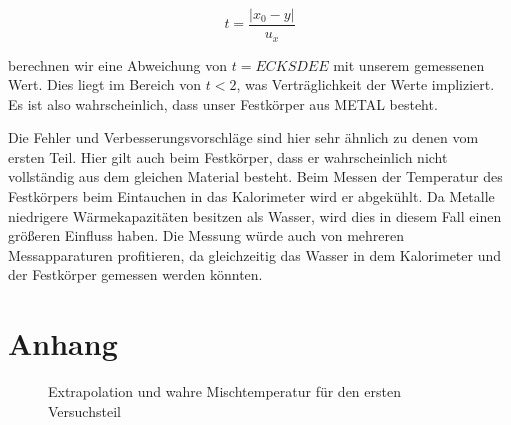 \documentclass[11pt,a4paper]{article}
\begin{document}
\begin{equation}
t=\frac{|x_0-y|}{u_x}\label{abw}
\end{equation}

berechnen wir eine Abweichung von $t=ECKSDEE$ mit unserem gemessenen Wert. Dies liegt im Bereich von $t<2$, was Vertr\"aglichkeit der Werte impliziert. Es ist also wahrscheinlich, dass unser Festk\"orper aus METAL besteht.

Die Fehler und Verbesserungsvorschl\"age sind hier sehr \"ahnlich zu denen vom ersten Teil. Hier gilt auch beim Festk\"orper, dass er wahrscheinlich nicht vollst\"andig aus dem gleichen Material besteht. Beim Messen der Temperatur des Festk\"orpers beim Eintauchen in das Kalorimeter wird er abgek\"uhlt. Da Metalle niedrigere W\"armekapazit\"aten besitzen als Wasser, wird dies in diesem Fall einen gr\"o\ss eren Einfluss haben. Die Messung w\"urde auch von mehreren Messapparaturen profitieren, da  gleichzeitig das Wasser in dem Kalorimeter und der Festk\"orper gemessen werden k\"onnten.

\pagebreak

\section{Anhang}


\begin{figure}[p]
\centering
{}
\renewcommand\thefigure{B2}
\caption[graph1]{Extrapolation und wahre Mischtemperatur f\"ur den ersten Versuchsteil}
\label{Abb:2}
\end{figure}
\end{document}
